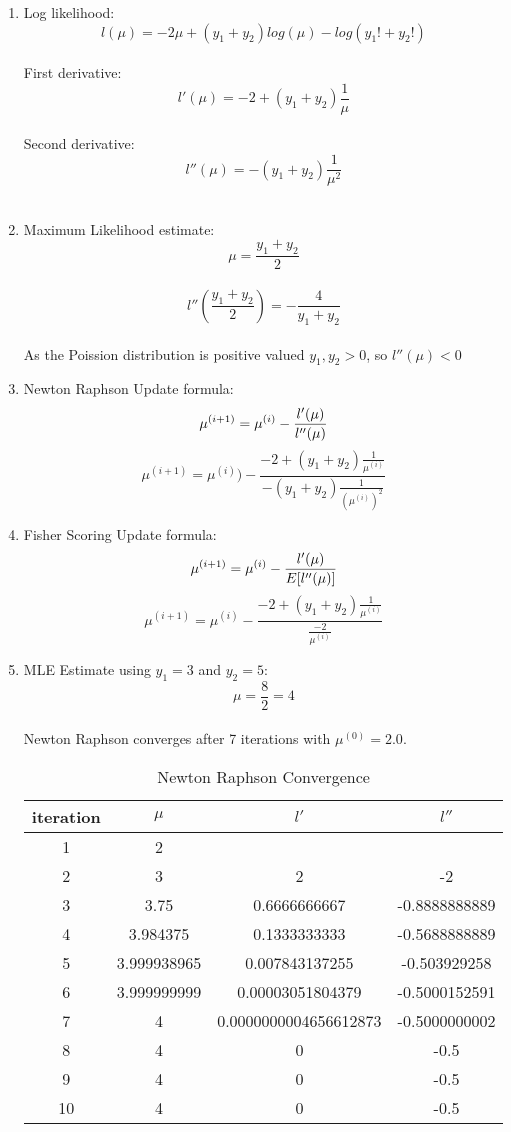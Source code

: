 \documentclass[11pt]{article}
\begin{document}
\begin{enumerate}[label=(\alph*)]
\item Log likelihood:
$$ l(\mu) = -2\mu + (y_1 + y_2)log(\mu) - log(y_{1}! + y_{2}!) $$ \\
First derivative:
$$ l'(\mu) = -2 + (y_1 + y_2)\frac{1}{\mu}$$ \\
Second derivative:
$$ l''(\mu) = -(y_1 + y_2)\frac{1}{\mu^2}$$ \\
\item Maximum Likelihood estimate:
$$ \mu = \frac{y_1 + y_2}{2} $$ \\
$$ l''(\frac{y_1 + y_2}{2}) =  -\frac{4}{y_1 + y_2}$$ \\
As the Poission distribution is positive valued $ y_1, y_2 > 0$, so $l''(\mu) < 0 $
\item Newton Raphson Update formula:
$$ \mu^{(i+1)} = \mu^{(i)}  - \frac{l'(\mu)}{l''(\mu)} \\ $$
$$ \mu^{(i+1)}  = \mu^{(i)} ) - \frac{-2 + (y_1 + y_2)\frac{1}{\mu^{(i)}}}{-(y_1 + y_2)\frac{1}{(\mu^{(i)})^2}}  $$
\item Fisher Scoring Update formula:
$$ \mu^{(i+1)}  = \mu^{(i)}  - \frac{l'(\mu)}{E[l''(\mu)]} \\ $$
$$ \mu^{(i+1)} = \mu^{(i)}  - \frac{-2 + (y_1 + y_2)\frac{1}{\mu^{(i)}}}{\frac{-2}{\mu^{(i)}}}  $$
\item MLE Estimate using $y_1 = 3$ and $y_2 = 5$:
$$ \mu = \frac{8}{2}  = 4$$ \\
Newton Raphson converges after 7 iterations with $\mu^{(0)} = 2.0$.
\begin{table}[h!]
\centering
\caption{Newton Raphson Convergence}
\begin{tabular}{c | c | c | c}
iteration & $\mu$          &$ l'$                    & $l''$           \\
\hline
1         & 2           &                       &               \\
2         & 3           & 2                     & -2            \\
3         & 3.75        & 0.6666666667          & -0.8888888889 \\
4         & 3.984375    & 0.1333333333          & -0.5688888889 \\
5         & 3.999938965 & 0.007843137255        & -0.503929258  \\
6         & 3.999999999 & 0.00003051804379      & -0.5000152591 \\
7         & 4           & 0.0000000004656612873 & -0.5000000002 \\
8         & 4           & 0                     & -0.5          \\
9         & 4           & 0                     & -0.5          \\
10        & 4           & 0                     & -0.5         
\end{tabular}
\end{table}


\end{enumerate}
\end{document}
